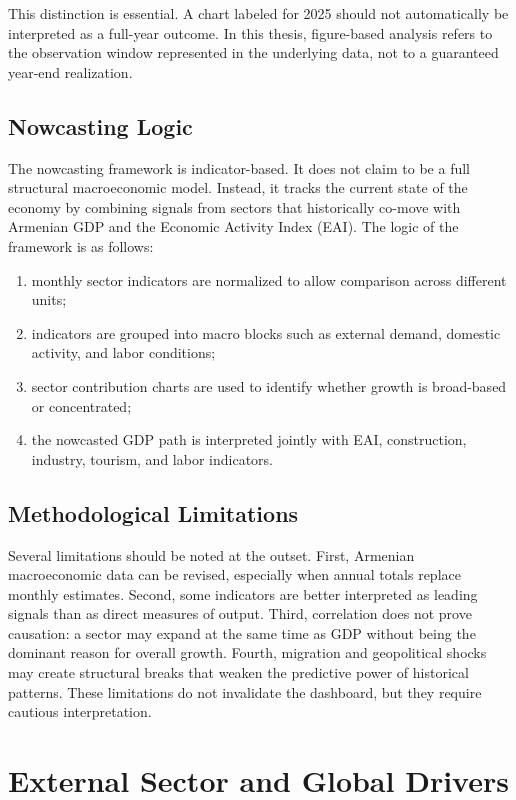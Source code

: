 \documentclass[12pt,a4paper]{report}
\begin{document}
This distinction is essential. A chart labeled for 2025 should not automatically be interpreted as a full-year outcome. In this thesis, figure-based analysis refers to the observation window represented in the underlying data, not to a guaranteed year-end realization.

\section{Nowcasting Logic}
The nowcasting framework is indicator-based. It does not claim to be a full structural macroeconomic model. Instead, it tracks the current state of the economy by combining signals from sectors that historically co-move with Armenian GDP and the Economic Activity Index (EAI). The logic of the framework is as follows:
\begin{enumerate}
    \item monthly sector indicators are normalized to allow comparison across different units;
    \item indicators are grouped into macro blocks such as external demand, domestic activity, and labor conditions;
    \item sector contribution charts are used to identify whether growth is broad-based or concentrated;
    \item the nowcasted GDP path is interpreted jointly with EAI, construction, industry, tourism, and labor indicators.
\end{enumerate}

\section{Methodological Limitations}
Several limitations should be noted at the outset. First, Armenian macroeconomic data can be revised, especially when annual totals replace monthly estimates. Second, some indicators are better interpreted as leading signals than as direct measures of output. Third, correlation does not prove causation: a sector may expand at the same time as GDP without being the dominant reason for overall growth. Fourth, migration and geopolitical shocks may create structural breaks that weaken the predictive power of historical patterns. These limitations do not invalidate the dashboard, but they require cautious interpretation.\cite{imfCR24348,wbPulse2025}

\chapter{External Sector and Global Drivers}
\end{document}
